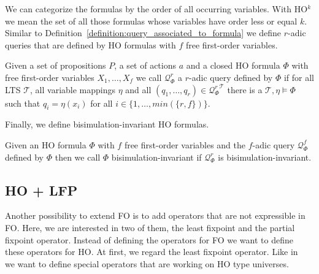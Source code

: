 We can categorize the formulas by the order of all occurring variables. With HO$^k$ we mean 
the set of all those formulas whose variables have order less or equal $k$.
Similar to Definition~\ref{definition:query_associated_to_formula} we define $r$-adic queries that are defined by HO formulas with $f$ free first-order variables. 

\begin{definition}
\label{definition:query_associated_to_formula_ho}
    Given a set of propositions $P$, a set of actions $a$ and a closed HO
    formula $\Phi$ with free first-order variables $X_1, \dots, X_f$ we call $\mathcal{Q}^r_\Phi$ a $r$-adic query defined by $\Phi$ if for all LTS $\mathcal{T}$, all variable mappings $\eta$ and all $(q_1, \dots, q_r) \in {\mathcal{Q}^r_\Phi}^\mathcal{T}$ there is a $\mathcal{T}, \eta \models
     \Phi$ such that $q_i = \eta(x_i)$ for all $i \in
    \{1, \dots, min(\{r, f\})\}$.
\end{definition}

Finally, we define bisimulation-invariant HO formulas.

\begin{definition} 
\label{definition:bisimulation_invariant_ho_formula}
	Given an HO formula $\Phi$ with $f$ free first-order variables and the $f$-adic query $\mathcal{Q}^f_\Phi$ defined by $\Phi$ then we call $\Phi$ bisimulation-invariant if $\mathcal{Q}^r_\Phi$ is bisimulation-invariant.
\end{definition}

\subsection{HO + LFP}
\label{subsec:hoPlusLfp}

Another possibility to extend FO is to add operators that are not expressible in FO. Here, we are interested in two
of them, the least fixpoint and the partial fixpoint operator. Instead of defining the operators for FO we want
to define these operators for HO. At first, we regard the least fixpoint operator.
Like in~\cite{freireMartins2011descriptive} we want to define special operators that are working on HO type universes.

